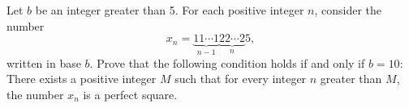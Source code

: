 Let $b$ be an integer greater than 5. For each positive integer $n$, consider the number
\[ x_n = \underbrace{11\cdots1}_{n-1}\underbrace{22\cdots2}_{n}5, \]
written in base $b$. Prove that the following condition holds if and only if $b = 10$: There exists a positive integer $M$ such that for every integer $n$ greater than $M$, the number $x_n$ is a perfect square.
